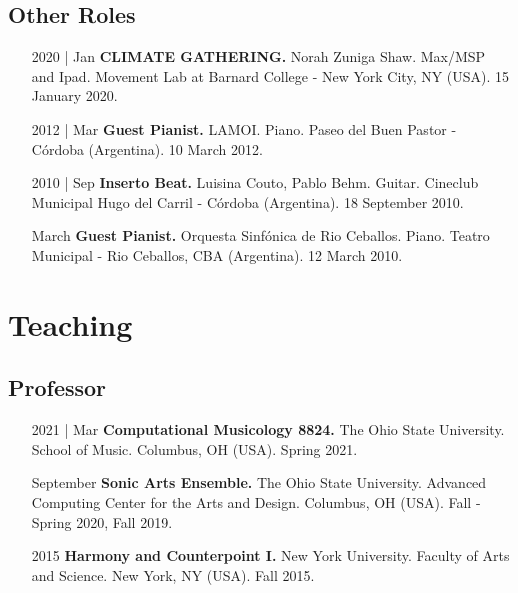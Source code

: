 \documentclass[12pt,overlapped]{res}%
\begin{document}
\begin{resume}
\subsection{Other Roles}%
\fullline%
\begin{itemize}[align=parleft,leftmargin=2.25cm,labelwidth=2cm]
\item[2020 | Jan]
\textbf{CLIMATE GATHERING.}
Norah Zuniga Shaw. 
Max/MSP and Ipad. 
Movement Lab at Barnard College {-} New York City, NY (USA). 
15 January 2020.
\end{itemize}%
\begin{itemize}[align=parleft,leftmargin=2.25cm,labelwidth=2cm]
\item[2012 | Mar]
\textbf{Guest Pianist.}
LAMOI. 
Piano. 
Paseo del Buen Pastor {-} Córdoba (Argentina). 
10 March 2012.
\end{itemize}%
\begin{itemize}[align=parleft,leftmargin=2.25cm,labelwidth=2cm]
\item[2010 | Sep]
\textbf{Inserto Beat.}
Luisina Couto, Pablo Behm. 
Guitar. 
Cineclub Municipal Hugo del Carril {-} Córdoba (Argentina). 
18 September 2010.
\end{itemize}%
\begin{itemize}[align=parleft,leftmargin=2.25cm,labelwidth=2cm]
\item[March]
\textbf{Guest Pianist.}
Orquesta Sinfónica de Rio Ceballos. 
Piano. 
Teatro Municipal {-} Rio Ceballos, CBA (Argentina). 
12 March 2010.
\end{itemize}


\section{Teaching}%
\label{sec:Teaching}%
\subsection{Professor}%
\fullline%
\begin{itemize}[align=parleft,leftmargin=2.25cm,labelwidth=2cm]
\item[2021 | Mar]
\textbf{Computational Musicology 8824.}
The Ohio State University. 
School of Music. 
Columbus, OH (USA). 
Spring 2021.
\end{itemize}%
\begin{itemize}[align=parleft,leftmargin=2.25cm,labelwidth=2cm]
\item[September]
\textbf{Sonic Arts Ensemble.}
The Ohio State University. 
Advanced Computing Center for the Arts and Design. 
Columbus, OH (USA). 
Fall - Spring 2020, Fall 2019.
\end{itemize}%
\begin{itemize}[align=parleft,leftmargin=2.25cm,labelwidth=2cm]
\item[2015]
\textbf{Harmony and Counterpoint I.}
New York University. 
Faculty of Arts and Science. 
New York, NY (USA). 
Fall 2015.
\end{itemize}%

\end{resume}
\end{document}
